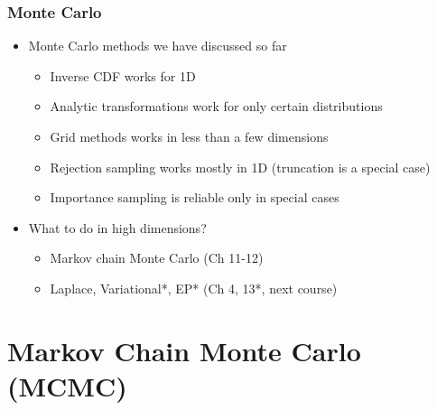 \documentclass[10pt]{beamer}
\begin{document}
\begin{frame}

\frametitle{ Monte Carlo}

  \begin{itemize}
  \item Monte Carlo methods we have discussed so far
    \begin{itemize}
    \item Inverse CDF works for 1D \pause
    \item Analytic transformations work for only certain distributions \pause
    \item Grid methods works in less than a few dimensions \pause
    \item Rejection sampling works mostly in 1D (truncation is a special case) \pause
    \item Importance sampling is reliable only in special cases
    \end{itemize}
    \pause
  \item What to do in high dimensions? \pause
    \begin{itemize}
    \item Markov chain Monte Carlo (Ch 11-12) \pause
    \item Laplace, Variational*, EP* (Ch 4, 13*, next course)
    \end{itemize}
  \end{itemize}
\end{frame}


\section{Markov Chain Monte Carlo (MCMC)}
\end{document}
